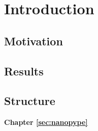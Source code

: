 \chapter{Introduction}
\label{sec:intro}



\section{Motivation}
\label{sec:intro:motivation}

\section{Results}
\label{sec:intro:results}


\section{Structure}
\label{sec:intro:structure}


\textbf{Chapter \ref{sec:nanopype}} \\[0.2em]
\blindtext

